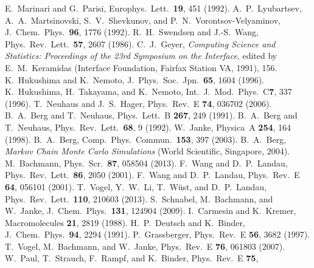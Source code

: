 %
%
E.~Marinari and G.~Parisi, Europhys.\ Lett.\ \textbf{19}, 451 (1992).
%
A.~P.\ Lyubartsev, A.~A.\ Martsinovski, S.~V.\ Shevkunov, and
P.~N.\ Vorontsov-Velyaminov, J.~Chem.\ Phys.\ \textbf{96}, 1776 (1992).
%
R.~H.\ Swendsen and J.-S.\ Wang, Phys.\ Rev.\ Lett.\
\textbf{57}, 2607 (1986).
%
C.~J.\ Geyer, \emph{Computing Science and Statistics: Proceedings
of the 23rd Symposium on the Interface}, edited  by E.~M.\ Keramidas
(Interface Foundation, Fairfax Station VA, 1991), 156.
%  
K.~Hukushima and K.~Nemoto, J.~Phys.\ Soc.\ Jpn.\ \textbf{65},
1604 (1996).
% 
K.~Hukushima, H.~Takayama, and K.~Nemoto, Int.~J.\ Mod.\ Phys.~C\textbf{7},
337 (1996).
%
%
T.~Neuhaus and J.~S.\ Hager, Phys.\ Rev.~E \textbf{74}, 036702 (2006).
%
B.~A.\ Berg and T.~Neuhaus, Phys.\ Lett.~B \textbf{267}, 249 (1991).
%
B.~A.\ Berg and T.~Neuhaus, Phys.\ Rev.\ Lett.\ \textbf{68}, 9 (1992).
%
W.~Janke, Physica~A \textbf{254}, 164 (1998).
%
B.~A.\ Berg, Comp.\ Phys.\ Commun.\ \textbf{153}, 397 (2003).
% 
B.~A.\ Berg, \textit{Markov Chain Monte Carlo Simulations}
(World Scientific, Singapore, 2004).
%
M.~Bachmann, Phys.\ Scr.\ \textbf{87}, 058504 (2013).
%
F.~Wang and D.~P.\ Landau, Phys.\ Rev.\ Lett.\ \textbf{86}, 2050 (2001).
%
F.~Wang and D.~P.\ Landau, Phys.\ Rev.~E \textbf{64}, 056101 (2001).
%
T.~Vogel, Y.~W.\ Li, T.~W\"ust, and D.~P.\ Landau, Phys.\ Rev.\ Lett.\
\textbf{110}, 210603 (2013).
%
%
S.~Schnabel, M.~Bachmann, and W.~Janke, J.~Chem.\ Phys.\ \textbf{131},
124904 (2009).
%
I.~Carmesin and K.~Kremer, Macromolecules \textbf{21}, 2819 (1988).
% 
\bibitem{bf2}
H.~P.~Deutsch and K.~Binder, J.~Chem.\ Phys.\ \textbf{94}, 2294 (1991).
%
\bibitem{grass2}
P.~Grassberger, Phys.\ Rev.~E \textbf{56}, 3682 (1997).
%
T.~Vogel, M.~Bachmann, and W.~Janke, Phys.\ Rev.~E \textbf{76}, 061803
(2007).
%
W.~Paul, T.~Strauch, F.~Rampf, and K.~Binder, Phys.\ Rev.~E \textbf{75},
